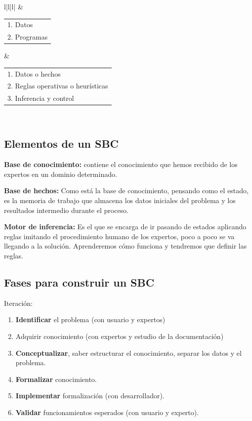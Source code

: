 \documentclass[12pt, twoside, openright]{report} %
\begin{document}
\begin{table}[H]
{\begin{tabular}{l|l|l|}
			 & \begin{tabular}[c]{@{}l@{}}1. Datos\\ 2. Programas\end{tabular}                            & \begin{tabular}[c]{@{}l@{}}1. Datos o hechos\\ 2. Reglas operativas o heurísticas\\ 3. Inferencia y control\end{tabular}                                \\ \hline
		\end{tabular}%
	}
\end{table}

\subsection{Elementos de un SBC}
\textbf{Base de conocimiento:} contiene el conocimiento que hemos recibido de los expertos en un dominio determinado.

\textbf{Base de hechos:} Como está la base de conocimiento, pensando como el estado, es la memoria de trabajo que almacena los datos iniciales del problema y los resultados intermedio durante el proceso.

\textbf{Motor de inferencia:} Es el que se encarga de ir pasando de estados aplicando reglas imitando el procedimiento humano de los expertos, poco a poco se va llegando a la solución. Aprenderemos cómo funciona y tendremos que definir las reglas.
\begin{figure}[H]
	{\def\svgwidth{.8\textwidth}
		}
\end{figure}
\pagebreak

\subsection{Fases para construir un SBC}
Iteración:
\begin{enumerate}
	\item \textbf{Identificar} el problema (con usuario y expertos)
	\item Adquirir conocimiento (con expertos y estudio de la documentación)
	\item \textbf{Conceptualizar}, saber estructurar el conocimiento, separar los datos y el problema.
	\item \textbf{Formalizar} conocimiento.
	\item \textbf{Implementar} formalización (con desarrollador).
	\item \textbf{Validar} funcionamientos esperados (con usuario y experto).
\end{enumerate}
\end{document}
